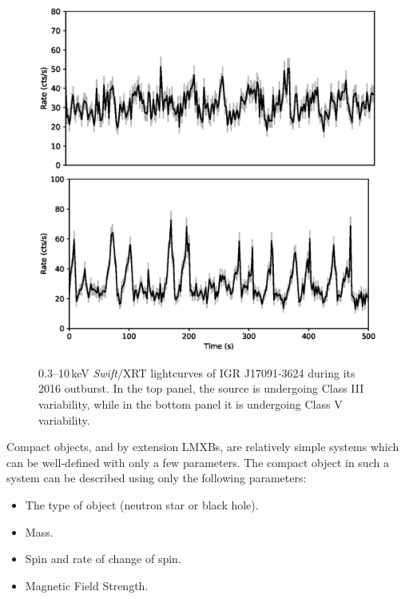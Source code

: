 \begin{figure}
  \centering
  \includegraphics[width=.9\linewidth, trim= 10mm 8mm 10mm 10mm,clip]{images/2016_III.eps}
  \includegraphics[width=.9\linewidth, trim= 10mm 0mm 10mm 10mm,clip]{images/2016_V.eps}
  \caption[\textit{Swift}/XRT lightcurves of IGR J17091-3624 during its 2016 outburst, showing two of the variability classes we identify in Chapter \ref{ch:IGR}.]{0.3--10\,keV \textit{Swift}/XRT lightcurves of IGR J17091-3624 during its 2016 outburst.  In the top panel, the source is undergoing Class III variability, while in the bottom panel it is undergoing Class V variability.}
  \label{fig:IGR2016}
\end{figure}

\par Compact objects, and by extension LMXBs, are relatively simple systems which can be well-defined with only a few parameters.  The compact object in such a system can be described using only the following parameters:

\begin{itemize}
\item The type of object (neutron star or black hole).
\item Mass.
\item Spin and rate of change of spin.
\item Magnetic Field Strength.
\end{itemize}

